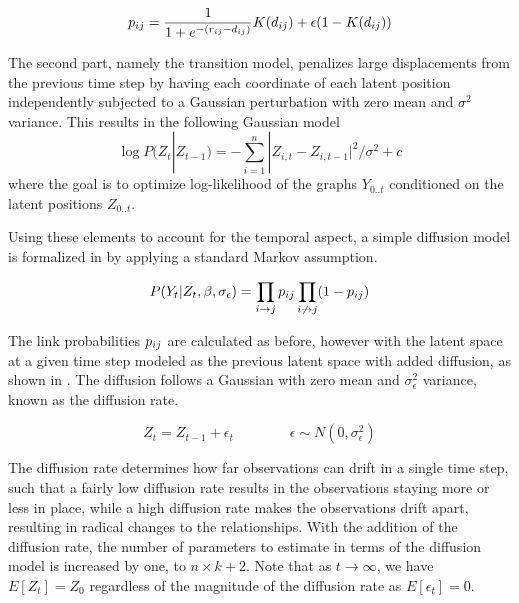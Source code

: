     \begin{equation}\label{eq:dsnl-link-proba}
        \sub(p)=\frac{1}{1 + e^{-(\sub(r)-\sub(d))}} K(\sub(d)) + \epsilon(1-K(\sub(d)))
    \end{equation}
    
    The second part, namely the transition model, penalizes large displacements from the previous time step by having each coordinate of each latent position independently subjected to a Gaussian perturbation with zero mean and $\sigma^2$ variance. This results in the following Gaussian model
    \begin{equation}\label{eq:dsnl-transition}
        \log P(Z_t|Z_{t-1}) = -\sum_{i=1}^n |Z_{i,t}-Z_{i,t-1}|^2 / \sigma^2 + c
    \end{equation}
    where the goal is to optimize log-likelihood of the graphs $Y_{0..t}$ conditioned on the latent positions $Z_{0..t}$.
    
    Using these elements to account for the temporal aspect, a simple diffusion model is formalized in  by applying a standard Markov assumption. 
    
    \begin{equation}\label{eq:dsnl-model}
        P(Y_t|Z_t,\beta,\sigma_\epsilon) = \prod_{\link}\sub(p)\prod_{\link*}(1-\sub(p))
    \end{equation}
    
    The link probabilities $\sub(p)$ are calculated as before, however with the latent space at a given time step modeled as the previous latent space with added diffusion, as shown in . The diffusion follows a Gaussian with zero mean and $\sigma_\epsilon^2$ variance, known as the diffusion rate.
    
    \begin{equation}\label{eq:dsnl-latent-space}
        Z_t = Z_{t-1} + \epsilon_t \qquad\qquad \epsilon \sim N(0,\sigma_\epsilon^2)
    \end{equation}
    
    The diffusion rate determines how far observations can drift in a single time step, such that a fairly low diffusion rate results in the observations staying more or less in place, while a high diffusion rate makes the observations drift apart, resulting in radical changes to the relationships. With the addition of the diffusion rate, the number of parameters to estimate in terms of the diffusion model is increased by one, to $n \times k + 2$. Note that as $t\rightarrow\infty$, we have $E[Z_t]=Z_0$ regardless of the magnitude of the diffusion rate as $E[\epsilon_t]=0$.
    


